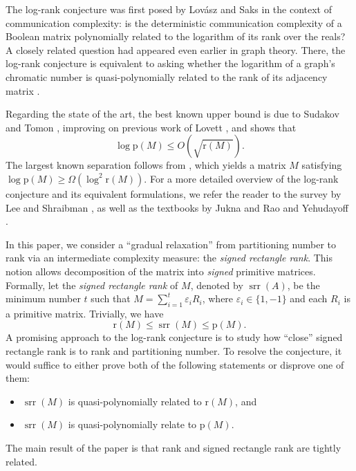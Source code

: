 \documentclass[11pt]{article}
\theoremstyle{plain}
\theoremstyle{remark}
\def\r{{\mathrm{r}}}
\def\p{{\mathrm{p}}}
\DeclareMathOperator{\ur}{srr}
\newcommand{\eps}{\varepsilon}
\begin{document}
The log-rank conjecture was first posed by Lov\'asz and Saks \cite{lovasz1988lattices} in the context of communication complexity: is the deterministic communication complexity of a Boolean matrix polynomially related to the logarithm of its rank over the reals? A closely related question had appeared even earlier in graph theory. There, the log-rank conjecture is equivalent to asking whether the logarithm of a graph's chromatic number is quasi-polynomially related to the rank of its adjacency matrix \cite{van1976bound,fajtlowicz1988conjectures,lovasz1988lattices}.


Regarding the state of the art, the best known upper bound is due to Sudakov and Tomon \cite{tomon2024matrix}, improving on previous work of Lovett \cite{lovett2016communication}, and shows that
\[ \log \p(M) \leq O\left(\sqrt{\r(M)} \right).\]
The largest known separation follows from \cite[Corollary 3]{Balodis21}, which yields a matrix $M$ satisfying $\log \p(M) \geq \Omega(\log^2 \r(M))$. 
For a more detailed overview of the log-rank conjecture and its equivalent formulations, we refer the reader to the survey by Lee and Shraibman \cite{lee2023around}, as well as the textbooks by Jukna \cite{jukna2012boolean} and Rao and Yehudayoff \cite{rao2020communication}.


In this paper, we consider a ``gradual relaxation'' from partitioning number to rank via an intermediate complexity measure: the \emph{signed rectangle rank}. This notion allows decomposition of the matrix into \textit{signed} primitive matrices. Formally, let the \emph{signed rectangle rank} of $M$, denoted by $\ur(A)$, be the minimum number $t$ such that $M= \sum_{i=1}^t \eps_i R_i$, where $\eps_i \in \{1,-1\}$ and each $R_i$ is a primitive matrix. Trivially, we have \[\r(M) \leq \ur(M) \leq \p(M).\]
A promising approach to the log-rank conjecture is to study how ``close'' signed rectangle rank is to rank and partitioning number. To resolve the conjecture, it would suffice to either prove both of the following statements or disprove one of them:
\begin{itemize}
	\item $\ur(M)$ is quasi-polynomially related to $\r(M)$, and
	\item $\ur(M)$ is quasi-polynomially relate to $\p(M)$.
\end{itemize}



The main result of the paper is that rank and signed rectangle rank are tightly related.
\end{document}
